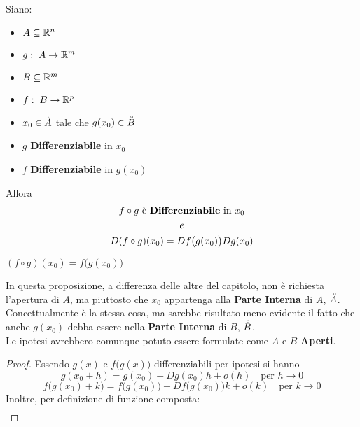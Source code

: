 \begin{proposition}
	\label{prop:diff_funz_comp}
	Siano:
	\begin{itemize}[noitemsep]
		\item $A \subseteq \mathbb{R}^n$
		\item $g:\; A \to \mathbb{R}^m$
		\item $B \subseteq \mathbb{R}^m$
		\item $f:\; B \to \mathbb{R}^p$
		\item $x_0 \in \accentset{\circ}{A}$ tale che $g(x_0) \in \accentset{\circ}{B}$
		\item $g$ \textbf{Differenziabile} in $x_0$
		\item $f$ \textbf{Differenziabile} in $g(x_0)$
	\end{itemize}
	Allora
	\[
		\begin{gathered}
			f \circ g \text{ è \textbf{Differenziabile} in } x_0\\
			e\\
			D(f \circ g)(x_0) = Df \bigl( g(x_0) \bigr) Dg(x_0)
		\end{gathered}
	\]
	\begin{note}
		$(f \circ g)(x_0) = f \bigl( g(x_0) \bigr)$
	\end{note}
	\begin{note}
		In questa proposizione, a differenza delle altre del capitolo, non è richiesta l'apertura di $A$, ma piuttosto che $x_0$ appartenga alla \textbf{Parte Interna} di $A$, $\accentset{\circ}{A}$. Concettualmente è la stessa cosa, ma sarebbe risultato meno evidente il fatto che anche $g(x_0)$ debba essere nella \textbf{Parte Interna} di $B$, $\accentset{\circ}{B}$.\\
		Le ipotesi avrebbero comunque potuto essere formulate come $A$ e $B$ \textbf{Aperti}.
	\end{note}
	\begin{proof}
		Essendo $g(x)$ e $f\bigl( g(x) \bigr)$ differenziabili per ipotesi si hanno
		\begin{equation}
			\label{eq:diff_somma_funz_Dg}
			g(x_0 + h) = g(x_0) + Dg(x_0)h + o(h) \quad \text{per } h \to 0
		\end{equation}
		\begin{equation}
			\label{eq:diff_somma_funz_Df}
			f\bigl( g(x_0) + k \bigr) = f\bigl( g(x_0) \bigr) + Df\bigl( g(x_0) \bigr)k + o(k) \quad \text{per } k \to 0
		\end{equation}
		Inoltre, per definizione di funzione composta:
		\begin{align*}

\end{align*}
\end{proof}
\end{proposition}
